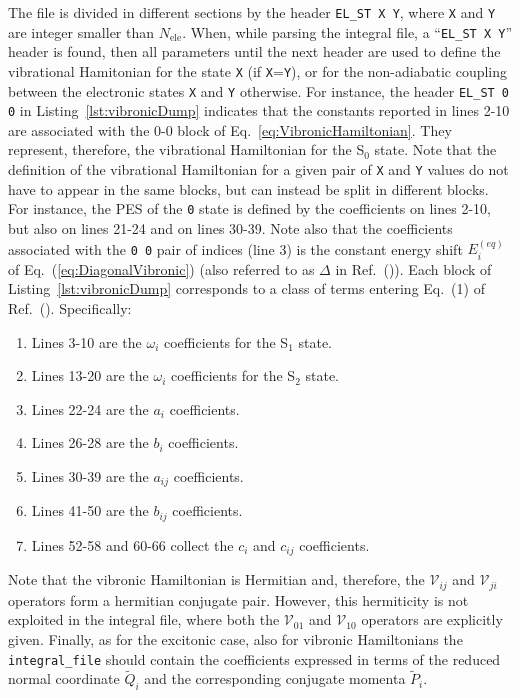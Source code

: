 \documentclass[bibliography=totoc,12pt,a4paper]{scrartcl}
\begin{document}
The file is divided in different sections by the header \texttt{EL\_ST X Y}, where \texttt{X} and \texttt{Y} are integer smaller than $N_\text{ele}$.
When, while parsing the integral file, a ``\texttt{EL\_ST X Y}'' header is found, then all parameters until the next header are used to define the vibrational Hamitonian for the state \texttt{X} (if \texttt{X}=\texttt{Y}), or for the non-adiabatic coupling between the electronic states \texttt{X} and \texttt{Y} otherwise.
For instance, the header \texttt{EL\_ST 0 0} in Listing~\ref{lst:vibronicDump} indicates that the constants reported in lines 2-10 are associated with the 0-0 block of Eq.~\ref{eq:VibronicHamiltonian}.
They represent, therefore, the vibrational Hamiltonian for the S$_0$ state.
Note that the definition of the vibrational Hamiltonian for a given pair of \texttt{X} and \texttt{Y} values do not have to appear in the same blocks, but can instead be split in different blocks.
For instance, the PES of the \texttt{0} state is defined by the coefficients on lines 2-10, but also on lines 21-24 and on lines 30-39.
Note also that the coefficients associated with the \texttt{0   0} pair of indices (line 3) is the constant energy shift $E_i^{(eq)}$ of Eq.~(\ref{eq:DiagonalVibronic}) (also referred to as $\Delta$ in Ref.~()).
Each block of Listing~\ref{lst:vibronicDump} corresponds to a class of terms entering Eq.~(1) of Ref.~().
Specifically:

\begin{enumerate}
  \item Lines 3-10 are the $\omega_i$ coefficients for the S$_1$ state.
  \item Lines 13-20 are the $\omega_i$ coefficients for the S$_2$ state.
  \item Lines 22-24 are the $a_i$ coefficients.
  \item Lines 26-28 are the $b_i$ coefficients.
  \item Lines 30-39 are the $a_{ij}$ coefficients.
  \item Lines 41-50 are the $b_{ij}$ coefficients.
  \item Lines 52-58 and 60-66 collect the $c_i$ and $c_{ij}$ coefficients.
\end{enumerate}

Note that the vibronic Hamiltonian is Hermitian and, therefore, the $\mathcal{V}_{ij}$ and $\mathcal{V}_{ji}$ operators form a hermitian conjugate pair.
However, this hermiticity is not exploited in the integral file, where both the $\mathcal{V}_{01}$ and $\mathcal{V}_{10}$ operators are explicitly given.
Finally, as for the excitonic case, also for vibronic Hamiltonians the \texttt{integral\_file} should contain the coefficients expressed in terms of the reduced normal coordinate $\tilde{Q}_i$ and the corresponding conjugate momenta $\tilde{P}_i$.
\end{document}
